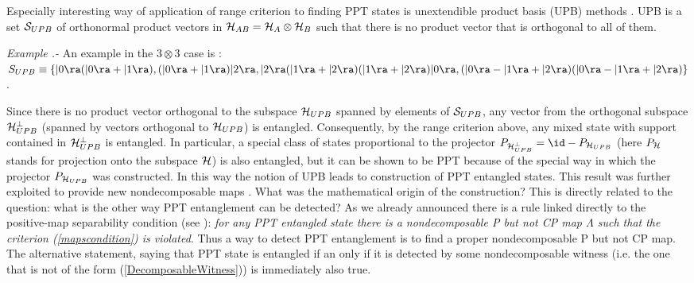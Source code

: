 \documentclass[rmp,12pt,preprint]{revtex4-2}
\begin{document}
Especially interesting way of application of range criterion to
finding PPT states is unextendible product basis (UPB) methods
\cite{BennettUPBI1999,UPB2}. UPB is a set ${\cal S}_{UPB}$ of
orthonormal product vectors in ${\cal H}_{AB}={\cal H}_{A} \otimes
{\cal H}_{B}$ such that there is no product vector that is orthogonal
to all of them.

{\it Example .-} An example in the $3 \otimes 3$ case is
\cite{BennettUPBI1999}: $S_{UPB} \equiv \{ |0\ra(|0\ra +|1\ra),
(|0\ra+|1\ra)|2\ra, |2\ra(|1\ra+|2\ra) (|1\ra+|2\ra)|0\ra, (|0\ra-|
1\ra +|2\ra)(|0\ra-|1\ra+|2\ra) \}$.

Since there is no product vector orthogonal to the subspace ${\cal
  H}_{UPB}$ spanned by elements of ${\cal S}_{UPB}$, any vector from
the orthogonal subspace ${\cal H}_{UPB}^{\perp}$ (spanned by vectors
orthogonal to ${\cal H}_{UPB}$) is entangled. Consequently, by the
range criterion above, any mixed state with support contained in
${\cal H}_{UPB}^{\perp}$ is entangled. In particular, a special class
of states proportional to the projector $P_{{\cal
    H}_{UPB}^{\perp}}=\id - P_{{\cal H}_{UPB}}$ (here $P_{{\cal H}}$
stands for projection onto the subspace ${\cal H}$) is also entangled,
but it can be shown to be PPT because of the special way in which the
projector $P_{{\cal H}_{UPB}}$ was constructed. In this way the notion
of UPB leads to construction of PPT entangled states.  This result was
further exploited to provide new nondecomposable maps
\cite{Terhal2000-laa}. What was the mathematical origin of the
construction? This is directly related to the question: what is the
other way PPT entanglement can be detected? As we already announced
there is a rule linked directly to the positive-map separability
condition (see \cite{sep1996}): {\it for any PPT entangled state there
  is a nondecomposable P but not CP map $\Lambda$ such that the
  criterion (\ref{mapscondition}) is violated}. Thus a way to detect
PPT entanglement is to find a proper nondecomposable P but not CP
map. The alternative statement, saying that PPT state is entangled if
an only if it is detected by some nondecomposable witness (i.e. the
one that is not of the form (\ref{DecomposableWitness})) is
immediately also true.
\end{document}
